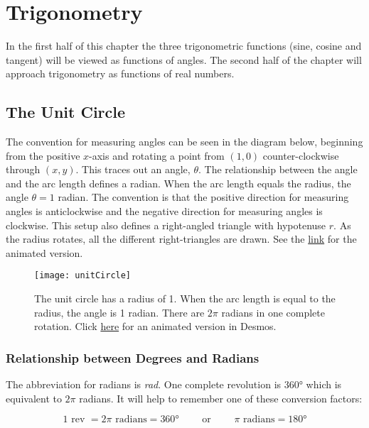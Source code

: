\chapter{Trigonometry}

In the first half of this chapter the three trigonometric functions (sine, cosine and tangent) will be viewed as functions of angles. The second half of the chapter will approach trigonometry as functions of real numbers.

\section{The Unit Circle}
The convention for measuring angles can be seen in the diagram below, beginning from the positive $x$-axis and rotating a point from $(1,0)$ counter-clockwise through $(x,y)$. This traces out an angle, $\theta$. The relationship between the angle and the arc length defines a radian. When the arc length equals the radius, the angle $\theta=1$ radian. The convention is that the positive direction for measuring angles is anticlockwise and the negative direction for measuring angles is clockwise. This setup also defines a right-angled triangle with hypotenuse $r$. As the radius rotates, all the different right-triangles are drawn. See the \href{https://www.desmos.com/calculator/4t6zc5eucd}{link} for the animated version.

\begin{figure}[h]
	\begin{center}
		\texttt{[image: unitCircle]}
		\caption{The unit circle has a radius of 1. When the arc length is equal to the radius, the angle is 1 radian. There are $2\pi$ radians in one complete rotation. Click \href{https://www.desmos.com/calculator/4t6zc5eucd}{here} for an animated version in Desmos.}
		\label{fig:unitCircle}
	\end{center}
\end{figure}

\subsection*{Relationship between Degrees and Radians}
The abbreviation for radians is \textit{rad}. One complete revolution is \ang{360} which is equivalent to $2 \pi $ radians. It will help to remember one of these conversion factors:
\begin{tcolorbox}\[1\text{ rev }=2\pi \text{ radians} =  \ang{360} \qquad\text{ or }\qquad\pi \text{ radians} =  \ang{180}\]
\end{tcolorbox}

